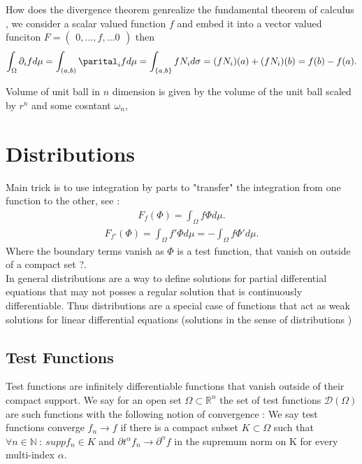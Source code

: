 \begin{example}
 How does the divergence theorem genrealize the fundamental theorem of calculus , 
 we consider a scalar valued function $f$ and embed it into a vector valued funciton $F = \begin{pmatrix} 0 , \ldots  , f , \ldots  0 \end{pmatrix} $ 
 then 
 \begin{align*}
   \int_{\Omega } \partial_i f d\mu  = \int_{(a,b)} \parital_i f  d\mu  = \int_{\{a,b\}  }f N_i d\sigma  = (fN_i)(a) + (fN_i)(b) = f(b)-f(a)
 .\end{align*}
\end{example}
\begin{example}
  Volume of unit ball in $n$ dimension is given by the volume of the unit ball scaled by $r^{n} $ and some cosntant $\omega_n$, 
\end{example}

\section{Distributions} %
\label{sec:Distributions}
Main trick is to use integration by parts to "transfer" the integration from one function to the other, see : 
\begin{align*}
  F_f(\Phi) =  \int_\Omega f \Phi d\mu 
.\end{align*} 
\begin{align*}
  F_{f'}(\Phi) = \int_\Omega f' \Phi  d\mu  = -\int_\Omega f \Phi' d\mu  
.\end{align*}
Where the boundary terms vanish as $\Phi $ is a test function, that vanish on outside of a compact set ?.\\[1ex]
In general distributions are a way to define solutions for partial differential equations 
that may not posses a regular solution that is continuously differentiable. Thus distributions are a special case of functions 
that act as weak solutions for linear differential equations  (solutions in the sense of distributions )
\subsection{Test Functions} %
\label{sub:Test Functions}
Test functions are infinitely differentiable functions that vanish outside of their compact support.
We say for an open set $\Omega  \subset \mathbb{R}^{n } $ the set of test functions $\mathcal{D}(\Omega )$ are such functions with the following 
notion of convergence : 
We say test functions converge $f_n \to f $ if there is a compact subset $K \subset  \Omega $ such that $\forall n \in  \mathbb{N} \ : \ supp f_n \in K$ and 
$\partial t ^{\alpha }f_n \to \partial ^{\alpha } f $ in the supremum norm on K for every multi-index $\alpha $.
